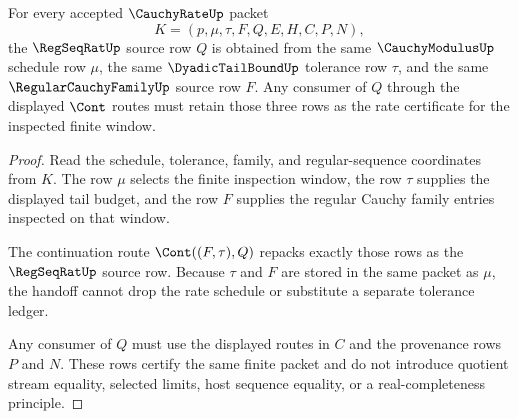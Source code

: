 \begin{theorem}
\label{thm:cauchy-rate-regular-family-handoff}
For every accepted $\CauchyRateUp$ packet
$$
K=(p,\mu,\tau,F,Q,E,H,C,P,N),
$$
the $\RegSeqRatUp$ source row $Q$ is obtained from the same $\CauchyModulusUp$ schedule row $\mu$, the same $\DyadicTailBoundUp$ tolerance row $\tau$, and the same $\RegularCauchyFamilyUp$ source row $F$. Any consumer of $Q$ through the displayed $\Cont$ routes must retain those three rows as the rate certificate for the inspected finite window.
\end{theorem}
\begin{proof}
Read the schedule, tolerance, family, and regular-sequence coordinates from $K$. The row $\mu$ selects the finite inspection window, the row $\tau$ supplies the displayed tail budget, and the row $F$ supplies the regular Cauchy family entries inspected on that window.

The continuation route $\Cont((F,\tau),Q)$ repacks exactly those rows as the $\RegSeqRatUp$ source row. Because $\tau$ and $F$ are stored in the same packet as $\mu$, the handoff cannot drop the rate schedule or substitute a separate tolerance ledger.

Any consumer of $Q$ must use the displayed routes in $C$ and the provenance rows $P$ and $N$. These rows certify the same finite packet and do not introduce quotient stream equality, selected limits, host sequence equality, or a real-completeness principle.
\end{proof}

